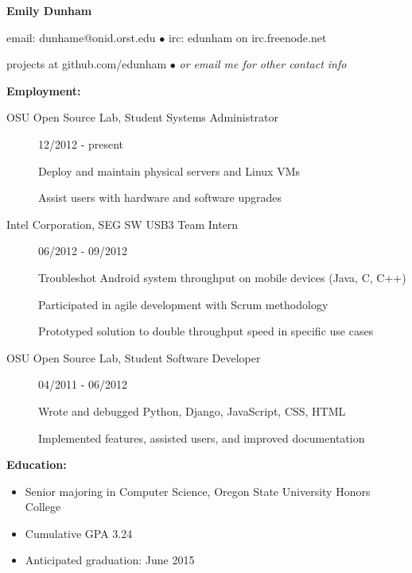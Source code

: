 \documentclass[11pt]{article}
\begin{document}
\centerline{{\LARGE \bf Emily Dunham}}

\bigskip

\centerline{email: dunhame@onid.orst.edu
        $\bullet$
        irc: edunham on irc.freenode.net}
\centerline{projects at github.com/edunham
        $\bullet$
        \emph{or email me for other contact info}}

\bigskip
\hrulefill
\bigskip

{\Large \bf Employment:}
\begin{description}
\item[OSU Open Source Lab, Student Systems Administrator]
    \hfill 12/2012 - present

    Deploy and maintain physical servers and Linux VMs

    Assist users with hardware and software upgrades

\item[Intel Corporation, SEG SW USB3 Team Intern]
    \hfill 06/2012 - 09/2012

    Troubleshot Android system throughput on mobile devices (Java, C, C++)

    Participated in agile development with Scrum methodology

    Prototyped solution to double throughput speed in specific use cases

\item[OSU Open Source Lab, Student Software Developer]
    \hfill 04/2011 - 06/2012

    Wrote and debugged Python, Django, JavaScript, CSS, HTML

    Implemented features, assisted users, and improved documentation
\end{description}

\smallskip
\hrulefill
\bigskip

{\Large \bf Education:}
\begin{itemize}
    \setlength{\itemsep}{1pt}
    \setlength{\parskip}{0pt}
    \setlength{\parsep}{0pt}

    \item Senior majoring in Computer Science, Oregon State University
          Honors College
    \item Cumulative GPA 3.24
    \item Anticipated graduation: June 2015

\end{itemize}

\smallskip
\hrulefill
\bigskip
\end{document}
